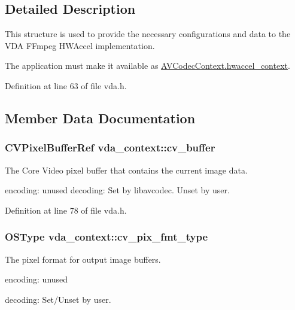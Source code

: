 \subsection{Detailed Description}
This structure is used to provide the necessary configurations and data to the V\+DA F\+Fmpeg H\+W\+Accel implementation.

The application must make it available as \hyperlink{struct_a_v_codec_context_ab222f7d747dfdceff0a76999e09648c0}{A\+V\+Codec\+Context.\+hwaccel\+\_\+context}. 

Definition at line 63 of file vda.\+h.



\subsection{Member Data Documentation}
\subsubsection[{\texorpdfstring{cv\+\_\+buffer}{cv_buffer}}]{\setlength{\rightskip}{0pt plus 5cm}C\+V\+Pixel\+Buffer\+Ref vda\+\_\+context\+::cv\+\_\+buffer}\hypertarget{structvda__context_af7d84ca967ed9591e45c036e7c579a6f}{}\label{structvda__context_af7d84ca967ed9591e45c036e7c579a6f}
The Core Video pixel buffer that contains the current image data.

encoding\+: unused decoding\+: Set by libavcodec. Unset by user. 

Definition at line 78 of file vda.\+h.

\subsubsection[{\texorpdfstring{cv\+\_\+pix\+\_\+fmt\+\_\+type}{cv_pix_fmt_type}}]{\setlength{\rightskip}{0pt plus 5cm}O\+S\+Type vda\+\_\+context\+::cv\+\_\+pix\+\_\+fmt\+\_\+type}\hypertarget{structvda__context_aceddeda581e0e4757ca20bff6fa75883}{}\label{structvda__context_aceddeda581e0e4757ca20bff6fa75883}
The pixel format for output image buffers.


\begin{DoxyItemize}
\item encoding\+: unused
\item decoding\+: Set/\+Unset by user. 
\end{DoxyItemize}

